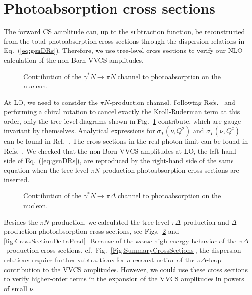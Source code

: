 \documentclass[12pt,preprint,tightenlines,
showpacs,preprintnumbers,amsmath,amssymb,
a4paper,nofootinbib]{revtex4-2}
\def\Eqref#1{Eq.~(\ref{eq:#1})}
\def\ga{\gamma} \def\Ga{{\it\Gamma}}
\begin{document}
\appendix
\small
\section{Photoabsorption cross sections}\label{App:CrossSections}

The forward CS amplitude can, up to the subtraction function, be
reconstructed from the total photoabsorption cross sections through the dispersion relations in \Eqref{genDRs}. Therefore, we use tree-level cross sections to verify our NLO calculation of the non-Born VVCS amplitudes.

\begin{figure}[tbh]
\begin{center}
\caption{\small{Contribution of the $\ga^\ast N \to  \pi N$ channel to photoabsorption on the nucleon. \label{Fig:DiagsOp}}}
\end{center}
\end{figure}

At LO, we need to consider the $\pi N$-production channel. Following Refs.~\cite{Holstein:2005db,Lensky:2009uv} and performing a chiral rotation to cancel exactly the Kroll-Ruderman term at this order, only the  tree-level diagrams shown in Fig.~\ref{Fig:DiagsOp} contribute, which are gauge invariant by themselves. Analytical expressions for $\sigma_T(\nu,Q^2)$ and $\sigma_L(\nu,Q^2)$ can be found in Ref.~\cite{Alarcon:2013cba}. The cross sections in the real-photon limit can be found in Refs.~\cite{Lensky:2009uv,Holstein:2005db}. We checked that the non-Born VVCS amplitudes at LO, the left-hand side of \Eqref{genDRs}, are reproduced by the right-hand side of the same equation when the tree-level $\pi N$-production photoabsorption cross sections are inserted. 

\begin{figure}[tbh]
\begin{center}
\caption{\small{Contribution of the $\ga^\ast N \to  \pi \Delta$ channel to photoabsorption on the nucleon. \label{Fig:DiagsDeltaCS}}}
\end{center}
\end{figure}

Besides the $\pi N$ production, we calculated the tree-level $\pi \Delta$-production and $ \Delta$-production photoabsorption cross sections, see Figs.~\ref{Fig:DiagsDeltaCS} and \ref{fig:CrossSectionDeltaProd}. Because of the worse high-energy behavior of the $\pi \Delta$-production cross sections, cf.\  Fig.~\ref{Fig:SummaryCrossSections}, the dispersion relations require further subtractions for a reconstruction of the $\pi \Delta$-loop contribution to the VVCS amplitudes. However, we could use these cross sections
to verify higher-order terms in the expansion of the VVCS amplitudes
in powers of small $\nu$.
\end{document}
